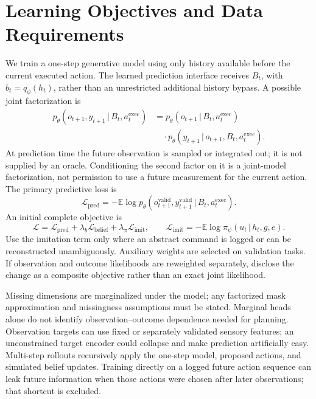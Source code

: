 \documentclass[11pt]{article}
\newcommand{\E}{\mathbb{E}}
\newcommand{\given}{\,\vert\,}
\begin{document}
\section{Learning Objectives and Data Requirements}
We train a one-step generative model using only history available before the current executed action. The learned prediction interface receives $B_t$, with $b_t=q_\phi(h_t)$, rather than an unrestricted additional history bypass. A possible joint factorization is
\begin{align}
p_\theta(o_{t+1},y_{t+1}\given B_t,a_t^{\mathrm{exec}})
&=p_\theta(o_{t+1}\given B_t,a_t^{\mathrm{exec}})\nonumber\\
&\quad\cdot p_\theta(y_{t+1}\given o_{t+1},B_t,a_t^{\mathrm{exec}}).
\end{align}
At prediction time the future observation is sampled or integrated out; it is not supplied by an oracle. Conditioning the second factor on it is a joint-model factorization, not permission to use a future measurement for the current action. The primary predictive loss is
\begin{equation}
\mathcal L_{\mathrm{pred}}=-\E\log p_\theta(o_{t+1}^{\mathrm{valid}},y_{t+1}^{\mathrm{valid}}\given B_t,a_t^{\mathrm{exec}}).
\end{equation}
An initial complete objective is
\begin{equation}
\mathcal L=\mathcal L_{\mathrm{pred}}+
\lambda_b\mathcal L_{\mathrm{belief}}+
\lambda_\pi\mathcal L_{\mathrm{imit}},\qquad
\mathcal L_{\mathrm{imit}}=-\E\log\pi_\psi(u_t\given h_t,g,e).
\label{eq:loss}
\end{equation}
Use the imitation term only where an abstract command is logged or can be reconstructed unambiguously. Auxiliary weights are selected on validation tasks. If observation and outcome likelihoods are reweighted separately, disclose the change as a composite objective rather than an exact joint likelihood.

Missing dimensions are marginalized under the model; any factorized mask approximation and missingness assumptions must be stated. Marginal heads alone do not identify observation--outcome dependence needed for planning. Observation targets can use fixed or separately validated sensory features; an unconstrained target encoder could collapse and make prediction artificially easy. Multi-step rollouts recursively apply the one-step model, proposed actions, and simulated belief updates. Training directly on a logged future action sequence can leak future information when those actions were chosen after later observations; that shortcut is excluded.
\end{document}
